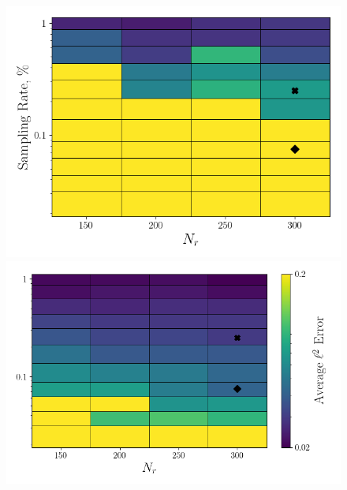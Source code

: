 
\begin{figure}
	\begin{minipage}{0.46\linewidth}
		\includegraphics[width=0.99\linewidth]{Chapters/HPROMResults/Images/cvrc/deim/err_contour_random_dt5e-7.png}
	\end{minipage}
	\begin{minipage}{0.53\linewidth}
		\includegraphics[width=0.99\linewidth]{Chapters/HPROMResults/Images/cvrc/deim/err_contour_eigenvec_dt5e-7.png}
	\end{minipage}


\end{figure}
